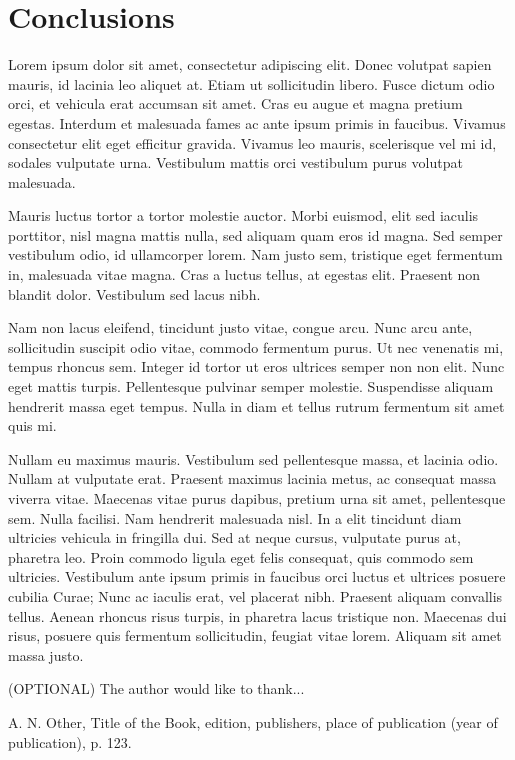 \documentclass[10pt, onecolumn]{revtex4}    %
\begin{document}
\section{Conclusions}
 
Lorem ipsum dolor sit amet, consectetur adipiscing elit. Donec volutpat sapien mauris, id lacinia leo aliquet at. Etiam ut sollicitudin libero. Fusce dictum odio orci, et vehicula erat accumsan sit amet. Cras eu augue et magna pretium egestas. Interdum et malesuada fames ac ante ipsum primis in faucibus. Vivamus consectetur elit eget efficitur gravida. Vivamus leo mauris, scelerisque vel mi id, sodales vulputate urna. Vestibulum mattis orci vestibulum purus volutpat malesuada.

Mauris luctus tortor a tortor molestie auctor. Morbi euismod, elit sed iaculis porttitor, nisl magna mattis nulla, sed aliquam quam eros id magna. Sed semper vestibulum odio, id ullamcorper lorem. Nam justo sem, tristique eget fermentum in, malesuada vitae magna. Cras a luctus tellus, at egestas elit. Praesent non blandit dolor. Vestibulum sed lacus nibh.

Nam non lacus eleifend, tincidunt justo vitae, congue arcu. Nunc arcu ante, sollicitudin suscipit odio vitae, commodo fermentum purus. Ut nec venenatis mi, tempus rhoncus sem. Integer id tortor ut eros ultrices semper non non elit. Nunc eget mattis turpis. Pellentesque pulvinar semper molestie. Suspendisse aliquam hendrerit massa eget tempus. Nulla in diam et tellus rutrum fermentum sit amet quis mi.

Nullam eu maximus mauris. Vestibulum sed pellentesque massa, et lacinia odio. Nullam at vulputate erat. Praesent maximus lacinia metus, ac consequat massa viverra vitae. Maecenas vitae purus dapibus, pretium urna sit amet, pellentesque sem. Nulla facilisi. Nam hendrerit malesuada nisl. In a elit tincidunt diam ultricies vehicula in fringilla dui. Sed at neque cursus, vulputate purus at, pharetra leo. Proin commodo ligula eget felis consequat, quis commodo sem ultricies. Vestibulum ante ipsum primis in faucibus orci luctus et ultrices posuere cubilia Curae; Nunc ac iaculis erat, vel placerat nibh. Praesent aliquam convallis tellus. Aenean rhoncus risus turpis, in pharetra lacus tristique non. Maecenas dui risus, posuere quis fermentum sollicitudin, feugiat vitae lorem. Aliquam sit amet massa justo.

\begin{acknowledgments}
(OPTIONAL) The author would like to thank...
\end{acknowledgments}

\begin{thebibliography}{}

 A. N. Other, Title of the Book, edition, publishers, place of publication (year of publication), p. 123.   %


\end{thebibliography} 
\end{document}
